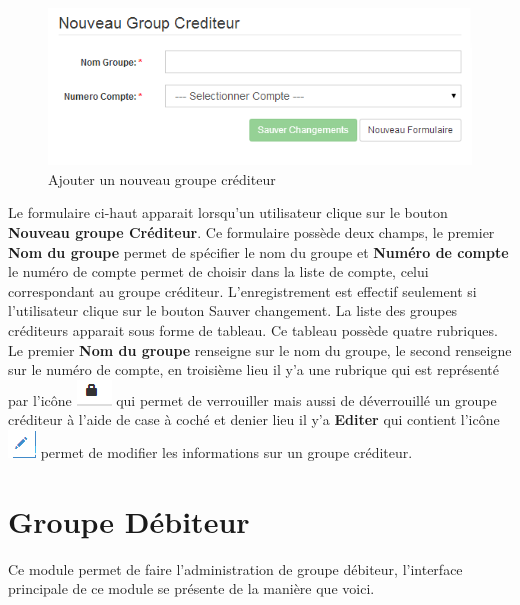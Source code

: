 \documentclass[12pt,a4paper]{report}
\begin{document}
\begin{figure}[h]
\begin{center}
\includegraphics[width=12cm]{pic/AddNewGroupCred.png}
\end{center}
\caption{Ajouter un nouveau groupe créditeur}
\label{Ajouter un nouveau groupe créditeur}
\end{figure}

Le formulaire ci-haut apparait lorsqu'un utilisateur clique sur le bouton \textbf{Nouveau groupe Créditeur}. Ce formulaire possède deux champs, le premier \textbf{Nom du groupe} permet de spécifier le nom du groupe et \textbf{Numéro de compte}  le numéro de compte permet de choisir dans la liste de compte, celui correspondant au groupe créditeur.
L'enregistrement est effectif seulement si l'utilisateur clique sur le bouton Sauver changement.
La liste des groupes créditeurs apparait sous forme de tableau. Ce tableau possède quatre rubriques. Le premier \textbf{Nom du groupe} renseigne sur le nom du groupe, le second renseigne sur le numéro de compte, en troisième lieu il y'a une rubrique qui est représenté par l'icône \includegraphics[scale=0.7]{pic/Locked.png}  qui permet de verrouiller mais aussi de déverrouillé un groupe créditeur à l'aide de case à coché et denier lieu il y'a \textbf{Editer} qui contient l'icône  \includegraphics[scale=0.7]{pic/EditUser.png} permet de modifier les informations sur un groupe créditeur.

\section{Groupe Débiteur}
Ce module permet de faire l'administration de groupe débiteur, l'interface principale de ce module se présente de la manière que voici.
\end{document}
